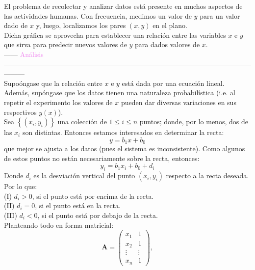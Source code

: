 \documentclass[11pt]{article}
\theoremstyle{definition}
\begin{document}
\begin{enumerate}[(i)]
El problema de recolectar y analizar datos est\'a presente en muchos aspectos de las actividades humanas. Con frecuencia, medimos un valor de $y$ para un valor dado de $x$ y, luego, localizamos los pares $(x, y)$ en el plano.\\
Dicha gr\'afica se aprovecha para establecer una relaci\'on entre las variables $x$ e $y$ que sirva para predecir nuevos valores de $y$ para dados valores de $x$.\\
\vspace{2mm} %
------ \textcolor{violet}{An\'alisis} ---------------------------------------------------------------------------------------------------------------------\\
\vspace{2mm} %
Supo\'ongase que la relaci\'on entre $x$ e $y$ est\'a dada por una ecuaci\'on lineal. Adem\'as, sup\'ongase que los datos tienen una naturaleza probabil\'istica (i.e. al repetir el experimento los valores de $x$ pueden dar diversas variaciones en sus respectivos $y(x)$).\\
Sea $\left\lbrace (x_{i}, y_{i}) \right\rbrace$ una colecci\'on de $1 \leq i \leq n$ puntos; donde, por lo menos, dos de las $x_{i}$ son distintas. Entonces estamos interesados en determinar la recta:
\begin{equation*}
y = b_{1}x + b_{0}
\end{equation*}
que mejor se ajusta a los datos (pues el sistema es inconsistente). Como algunos de estos puntos no est\'an necesariamente sobre la recta, entonces:
\begin{equation*}
y_{i} = b_{1}x_{i} + b_{0} + d_{i}
\end{equation*}
Donde $d_{i}$ es la desviaci\'on vertical del punto $(x_{i}, y_{i})$ respecto a la recta deseada. Por lo que:\\
(I) $d_{i} > 0$, si el punto est\'a por encima de la recta.\\
(II) $d_{i} = 0$, si el punto est\'a en la recta.\\
(III) $d_{i} < 0$, si el punto est\'a por debajo de la recta.\\
Planteando todo en forma matricial:
\begin{equation*}
\textbf{A} =
\begin{pmatrix}
x_{1} & 1\\
x_{2} & 1\\
\vdots & \vdots\\
x_{n} & 1
\end{pmatrix}, 

\end{equation*}
\end{enumerate}
\end{document}
